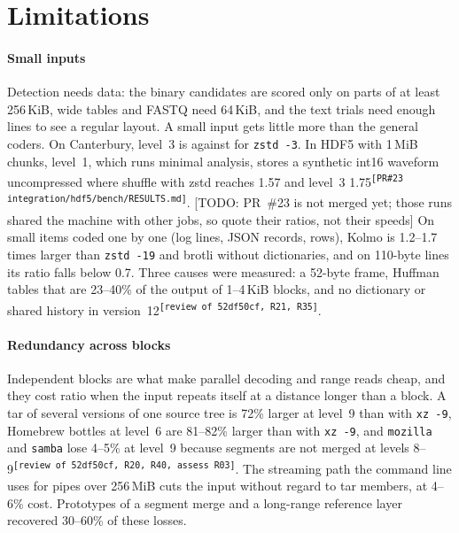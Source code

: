 \documentclass[conference]{IEEEtran}
\newcommand{\src}[1]{\textsuperscript{\tiny\color{gray}\texttt{[#1]}}}
\newcommand{\todoin}[1]{{\color{red}\footnotesize[TODO: #1]}}
\newcommand{\src}[1]{}
\newcommand{\todoin}[1]{}
\begin{document}
\section{Limitations}\label{sec:limits}

\paragraph*{Small inputs} Detection needs data: the binary candidates are scored only on parts of at least 256\,KiB,
wide tables and FASTQ need 64\,KiB, and the text trials need enough lines to see a regular layout. A small input
gets little more than the general coders. On Canterbury, level~3 is
\numCantKThree{} against \numCantZThree{} for \texttt{zstd -3}. In HDF5 with 1\,MiB chunks, level~1, which runs minimal analysis, stores a synthetic int16
waveform uncompressed where shuffle with zstd reaches 1.57 and level~3 1.75\src{PR\#23 integration/hdf5/bench/RESULTS.md}.
\todoin{PR~\#23 is not merged yet; those runs shared the machine with other jobs, so quote their ratios, not their
speeds} On small items coded one by one (log lines, JSON records, rows), Kolmo is 1.2--1.7 times larger than
\texttt{zstd -19} and brotli without dictionaries, and on 110-byte lines its ratio falls below 0.7. Three causes
were measured: a 52-byte frame, Huffman tables that are 23--40\% of the output of 1--4\,KiB blocks, and no
dictionary or shared history in version~12\src{review of 52df50cf, R21, R35}.

\paragraph*{Redundancy across blocks} Independent blocks are what make parallel decoding and range reads cheap, and
they cost ratio when the input repeats itself at a distance longer than a block. A tar of several versions of one
source tree is 72\% larger at level~9 than with \texttt{xz -9}, Homebrew bottles at level~6 are 81--82\% larger than
with \texttt{xz -9}, and \texttt{mozilla} and \texttt{samba} lose 4--5\% at level~9 because segments are not merged
at levels 8--9\src{review of 52df50cf, R20, R40, assess R03}. The streaming path the command line uses for pipes over
256\,MiB cuts the input without regard to tar members, at 4--6\% cost. Prototypes of a segment merge and a long-range
reference layer recovered 30--60\% of these losses.
\end{document}
